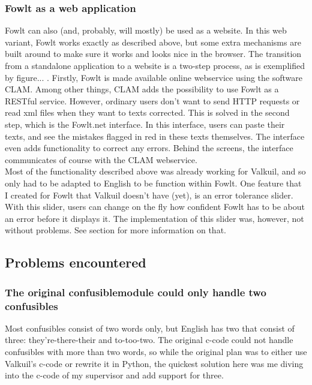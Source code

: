 \documentclass[12pt]{article}
\begin{document}
\subsubsection{Fowlt as a web application}
Fowlt can also (and, probably, will mostly) be used as a website. In this web variant, Fowlt works exactly as described above, but some extra mechanisms are built around to make sure it works and looks nice in the browser. The transition from a standalone application to a website is a two-step process, as is exemplified by figure... . Firstly, Fowlt is made available online webservice using the software CLAM. Among other things, CLAM adds the possibility to use Fowlt as a RESTful service. However, ordinary users don't want to send HTTP requests or read xml files when they want to texts corrected. This is solved in the second step, which is the Fowlt.net interface. In this interface, users can paste their texts, and see the mistakes flagged in red in these texts themselves. The interface even adds functionality to correct any errors. Behind the screens, the interface communicates of course with the CLAM webservice.
\\\indent
Most of the functionality described above was already working for Valkuil, and so only had to be adapted to English to be function within Fowlt. One feature that I created for Fowlt that Valkuil doesn't have (yet), is an error tolerance slider. With this slider, users can change on the fly how confident Fowlt has to be about an error before it displays it. The implementation of this slider was, however, not without problems. See section for more information on that.

\subsection{Problems encountered}

\subsubsection{The original confusiblemodule could only handle two confusibles}
Most confusibles consist of two words only, but English has two that consist of three: they're-there-their and to-too-two. The original c-code could not handle confusibles with more than two words, so while the original plan was to either use Valkuil's c-code or rewrite it in Python, the quickest solution here was me diving into the c-code of my supervisor and add support for three.
\end{document}
